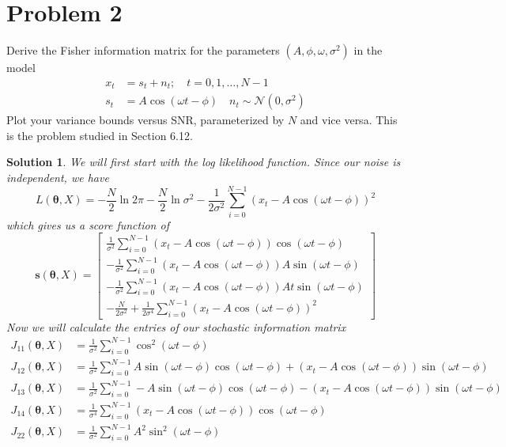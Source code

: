 \documentclass[a4paper]{article}
\newtheorem*{sol}{Solution}
\begin{document}
\section*{Problem 2}%
Derive the Fisher information matrix for the parameters $(A, \phi, \omega, \sigma^2)$ in the model
\[
  \begin{aligned}
    x_t &= s_t + n_t; \quad t = 0,1, \dots, N-1 \\
    s_t &= A\cos(\omega t - \phi) \quad n_t \sim \mathcal{N} \left( 0, \sigma^2 \right)
  \end{aligned}
\]
Plot your variance bounds versus SNR, parameterized by $N$ and vice versa. This is the problem studied in Section 6.12.
\begin{sol}
  We will first start with the log likelihood function. Since our noise is independent, we have
  \[
    L(\bm{\theta}, X) =  - \frac{N}{2} \ln{2\pi}  - \frac{N}{2} \ln{\sigma^2} - \frac{1}{2\sigma^2} \sum_{i=0}^{N-1} (x_t - A \cos(\omega t - \phi))^2
  \]
  which gives us a score function of
  \[
    \bm{s}(\bm{\theta}, X)  = 
    \begin{bmatrix}
      \frac{1}{\sigma^2} \sum_{i=0}^{N-1} (x_t - A\cos(\omega t - \phi))\cos(\omega t - \phi) \\
      -\frac{1}{\sigma^2} \sum_{i=0}^{N-1} (x_t - A\cos(\omega t - \phi))A\sin(\omega t - \phi) \\
      -\frac{1}{\sigma^2} \sum_{i=0}^{N-1}(x_t - A\cos(\omega t - \phi)) At \sin(\omega t - \phi) \\
      - \frac{N}{2 \sigma^2} + \frac{1}{2\sigma^4} \sum_{i=0}^{N-1} (x_t - A \cos(\omega t - \phi))^2
    \end{bmatrix}
  \]
  Now we will calculate the entries of our stochastic information matrix
  \[
    \begin{aligned}
      J_{11}(\bm{\theta}, X) &= \frac{1}{\sigma^2} \sum_{i=0}^{N-1} \cos^2(\omega t - \phi) \\
      J_{12} (\bm{\theta}, X) &= \frac{1}{\sigma^2} \sum_{i=0}^{N-1} A \sin(\omega t - \phi)\cos(\omega t - \phi) + (x_t - A\cos(\omega t - \phi))\sin(\omega t - \phi) \\
      J_{13} (\bm{\theta}, X) &=  \frac{1}{\sigma^2} \sum_{i=0}^{N-1} -A \sin(\omega t - \phi)\cos(\omega t - \phi) - (x_t - A \cos(\omega t - \phi))\sin(\omega t - \phi) \\
      J_{14} (\bm{\theta}, X) &=  \frac{1}{\sigma^4} \sum_{i=0}^{N-1} (x_t - A \cos(\omega t - \phi)) \cos(\omega t - \phi) \\
      J_{22}(\bm{\theta}, X) &= \frac{1}{\sigma^2} \sum_{i=0}^{N-1} A^2 \sin^2(\omega t - \phi) \\

\end{aligned}\]
\end{sol}
\end{document}
